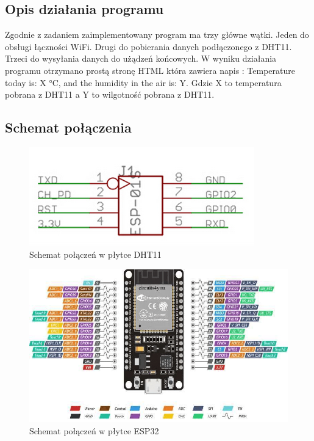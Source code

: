 \documentclass{article}
\begin{document}
        \subsection{Opis działania programu}
            Zgodnie z zadaniem zaimplementowany program ma trzy główne wątki. Jeden do obsługi 
            łączności WiFi. Drugi do pobierania danych podłączonego z DHT11. Trzeci do wysyłania
            danych do użądzeń końcowych. W wyniku działania programu otrzymano prostą stronę
            HTML która zawiera napis : Temperature today is: X °C, and the humidity in the air is: Y.
            Gdzie X to temperatura pobrana z DHT11 a Y to wilgotność pobrana z DHT11.
        \subsection{Schemat połączenia}
            \begin{figure}[ht]
                \centering
                \includegraphics[width=\textwidth]{images/Zrzut ekranu 2025-01-27 004040.png}
                \caption{Schemat połączeń w płytce DHT11}
                \label{fig:DHT11schema}
            \end{figure}
            \FloatBarrier
            \begin{figure}[ht]
                \centering
                \includegraphics[width=\textwidth]{images/Pinout-diagram-of-ESP32.png}
                \caption{Schemat połączeń w płytce ESP32}
                \label{fig:ESP32schema}
            \end{figure}
\end{document}
